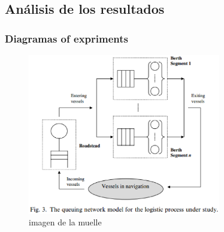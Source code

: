 \documentclass{beamer}
\begin{document}
\subsection{Análisis de los resultados}
\begin{frame}
\frametitle{Diagramas of expriments }

\begin{figure}[!th]
\begin{center}
\includegraphics[width=0.75\textwidth]{img/imagen_moeye.eps}
\caption{imagen de la muelle}
\label{fig:1}
\end{center}
\end{figure}

\end{frame}
\end{document}
